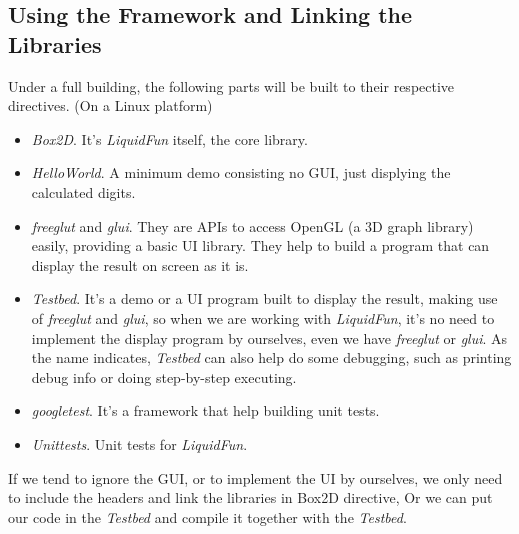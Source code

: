 \documentclass[UTF8]{ctexart}
\begin{document}
        \subsection{Using the Framework and Linking the Libraries}

            Under a full building, the following parts will be built to their respective directives. (On a Linux platform)

            \begin{itemize}
                \item \textit{Box2D}. It's \textit{LiquidFun} itself, the core library.
                \item \textit{HelloWorld}. A minimum demo consisting no GUI, just displying the calculated digits.
                \item \textit{freeglut} and \textit{glui}. They are APIs to access OpenGL (a 3D graph library) easily, providing a basic UI library. They help to build a program that can display the result on screen as it is.
                \item \textit{Testbed}. It's a demo or a UI program built to display the result, making use of \textit{freeglut} and \textit{glui}, so when we are working with \textit{LiquidFun}, it's no need to implement the display program by ourselves, even we have \textit{freeglut} or \textit{glui}. As the name indicates, \textit{Testbed} can also help do some debugging, such as printing debug info or doing step-by-step executing.
                \item \textit{googletest}. It's a framework that help building unit tests.
                \item \textit{Unittests}. Unit tests for \textit{LiquidFun}.
            \end{itemize}
            
            If we tend to ignore the GUI, or to implement the UI by ourselves, we only need to include the headers and link the libraries in Box2D directive, Or we can put our code in the \textit{Testbed} and compile it together with the \textit{Testbed}.
\end{document}
